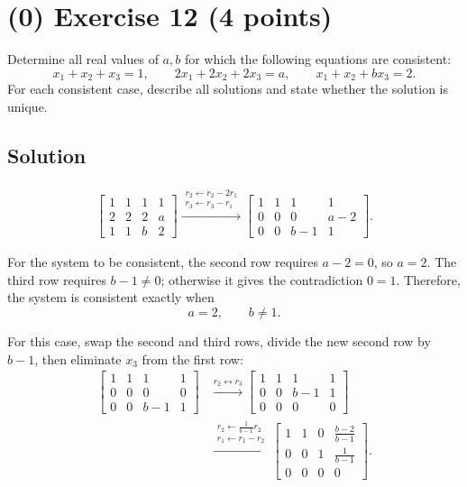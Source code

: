 \documentclass[12pt,a4paper]{article}
\begin{document}
\vspace{3cm}
\vfill
\clearpage
\section*{(0) Exercise 12 \hfill {\normalsize (4 points)}}
Determine all real values of $a,b$ for which the following equations are consistent:
\[
x_1+x_2+x_3=1,\qquad
2x_1+2x_2+2x_3=a,\qquad
x_1+x_2+bx_3=2.
\]
For each consistent case, describe all solutions and state whether the solution is unique.
\subsection*{Solution}

\begin{align*}
	\begin{bmatrix}
		1 & 1 & 1 & 1 \\
		2 & 2 & 2 & a \\
		1 & 1 & b & 2
\end{bmatrix}
\xrightarrow{\substack{r_2 \leftarrow r_2-2r_1\\ r_3 \leftarrow r_3-r_1}}
\begin{bmatrix}
		1 & 1 & 1 & 1 \\
		0 & 0 & 0 & a-2 \\
		0 & 0 & b-1 & 1
	\end{bmatrix}.
\end{align*}

For the system to be consistent, the second row requires $a-2=0$, so
$a=2$. The third row requires $b-1\ne 0$; otherwise it gives the
contradiction $0=1$. Therefore, the system is consistent exactly when
\[
a=2,\qquad b\ne 1.
\]

For this case, swap the second and third rows, divide the new second row
by $b-1$, then eliminate $x_3$ from the first row:
\begin{align*}
\begin{bmatrix}
1 & 1 & 1 & 1\\
0 & 0 & 0 & 0\\
0 & 0 & b-1 & 1
\end{bmatrix}
&\xrightarrow{r_2 \leftrightarrow r_3}
\begin{bmatrix}
1 & 1 & 1 & 1\\
0 & 0 & b-1 & 1\\
0 & 0 & 0 & 0
\end{bmatrix}\\
&\xrightarrow{\substack{r_2 \leftarrow \frac{1}{b-1}r_2\\r_1 \leftarrow r_1-r_2}}
\begin{bmatrix}
1 & 1 & 0 & \frac{b-2}{b-1}\\
0 & 0 & 1 & \frac{1}{b-1}\\
0 & 0 & 0 & 0
\end{bmatrix}.
\end{align*}
\end{document}
